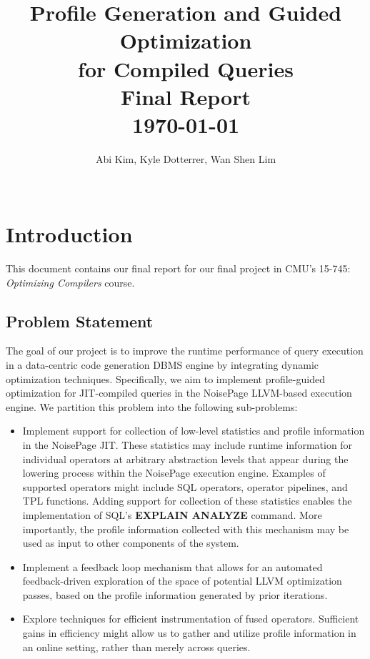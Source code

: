 \documentclass{vldb}
\newcommand{\paperTitle}{Profile Generation and Guided Optimization\\ for Compiled Queries\\ 
    \large Final Report\\
    \today}
\newcommand{\dbCode}[1]{{\sffamily\small \textbf{#1}}\xspace}
\begin{document}
\title{\paperTitle}

\author{
    \alignauthor Abi Kim, Kyle Dotterrer, Wan Shen Lim\\
    \\
}

\makeatletter
\def\@copyrightspace{\relax}
\makeatother

\maketitle


\section{Introduction}

This document contains our final report for our final project in CMU's 15-745: \textit{Optimizing Compilers} course. 

\subsection{Problem Statement}

The goal of our project is to improve the runtime performance of query execution in a data-centric code generation DBMS engine by integrating dynamic optimization techniques. Specifically, we aim to implement profile-guided optimization for JIT-compiled queries in the NoisePage \cite{noisepage} LLVM-based execution engine. We partition this problem into the following sub-problems:

\begin{itemize}
    \item Implement support for collection of low-level statistics and profile information in the NoisePage JIT. These statistics may include runtime information for individual operators at arbitrary abstraction levels that appear during the lowering process within the NoisePage execution engine. Examples of supported operators might include SQL operators, operator pipelines, and TPL functions.  Adding support for collection of these statistics enables the implementation of SQL's \dbCode{EXPLAIN ANALYZE} command. More importantly, the profile information collected with this mechanism may be used as input to other components of the system.
    \item Implement a feedback loop mechanism that allows for an automated feedback-driven exploration of the space of potential LLVM optimization passes, based on the profile information generated by prior iterations.
    \item Explore techniques for efficient instrumentation of fused operators. Sufficient gains in efficiency might allow us to gather and utilize profile information in an online setting, rather than merely across queries.
\end{itemize}
\end{document}
